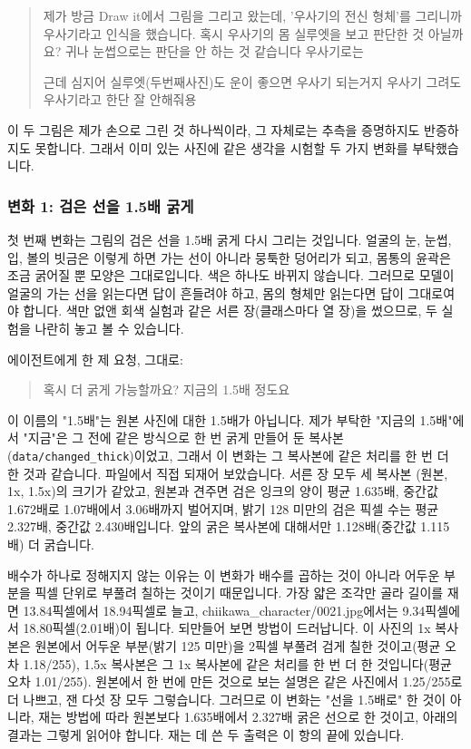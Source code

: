 \documentclass[11pt]{article}
\begin{document}
\begin{quote}\small
제가 방금 Draw it에서 그림을 그리고 왔는데, '우사기의 전신 형체'를
그리니까 우사기라고 인식을 했습니다. 혹시 우사기의 몸 실루엣을 보고
판단한 것 아닐까요? 귀나 눈썹으로는 판단을 안 하는 것 같습니다
우사기로는

근데 심지어 실루엣(두번째사진)도 운이 좋으면 우사기 되는거지 우사기
그려도 우사기라고 한단 잘 안해줘용
\end{quote}

이 두 그림은 제가 손으로 그린 것 하나씩이라, 그 자체로는 추측을 증명하지도
반증하지도 못합니다. 그래서 이미 있는 사진에 같은 생각을 시험할 두 가지 변화를
부탁했습니다.

\subsubsection*{변화 1: 검은 선을 1.5배 굵게}

첫 번째 변화는 그림의 검은 선을 1.5배 굵게 다시 그리는 것입니다. 얼굴의 눈,
눈썹, 입, 볼의 빗금은 이렇게 하면 가는 선이 아니라 뭉툭한 덩어리가 되고,
몸통의 윤곽은 조금 굵어질 뿐 모양은 그대로입니다. 색은 하나도 바뀌지 않습니다.
그러므로 모델이 얼굴의 가는 선을 읽는다면 답이 흔들려야 하고, 몸의 형체만
읽는다면 답이 그대로여야 합니다. 색만 없앤 회색 실험과 같은 서른 장(클래스마다
열 장)을 썼으므로, 두 실험을 나란히 놓고 볼 수 있습니다.

에이전트에게 한 제 요청, 그대로:
\begin{quote}\small
혹시 더 굵게 가능할까요? 지금의 1.5배 정도요
\end{quote}

이 이름의 "1.5배"는 원본 사진에 대한 1.5배가 아닙니다. 제가 부탁한 "지금의
1.5배"에서 "지금"은 그 전에 같은 방식으로 한 번 굵게 만들어 둔 복사본
(\texttt{data/changed\_thick})이었고, 그래서 이 변화는 그 복사본에 같은 처리를 한
번 더 한 것과 같습니다. 파일에서 직접 되재어 보았습니다. 서른 장 모두 세 복사본
(원본, 1x, 1.5x)의 크기가 같았고, 원본과 견주면 검은 잉크의 양이 평균 1.635배,
중간값 1.672배로 1.07배에서 3.06배까지 벌어지며, 밝기 128 미만의 검은 픽셀 수는
평균 2.327배, 중간값 2.430배입니다. 앞의 굵은 복사본에 대해서만 1.128배(중간값
1.115배) 더 굵습니다.

배수가 하나로 정해지지 않는 이유는 이 변화가 배수를 곱하는 것이 아니라 어두운
부분을 픽셀 단위로 부풀려 칠하는 것이기 때문입니다. 가장 얇은 조각만 골라 길이를
재면 13.84픽셀에서 18.94픽셀로 늘고, chiikawa\_character/0021.jpg에서는 9.34픽셀에서
18.80픽셀(2.01배)이 됩니다. 되만들어 보면 방법이 드러납니다. 이 사진의 1x 복사본은
원본에서 어두운 부분(밝기 125 미만)을 2픽셀 부풀려 검게 칠한 것이고(평균 오차
1.18/255), 1.5x 복사본은 그 1x 복사본에 같은 처리를 한 번 더 한 것입니다(평균 오차
1.01/255). 원본에서 한 번에 만든 것으로 보는 설명은 같은 사진에서 1.25/255로 더
나쁘고, 잰 다섯 장 모두 그렇습니다. 그러므로 이 변화는 "선을 1.5배로" 한 것이
아니라, 재는 방법에 따라 원본보다 1.635배에서 2.327배 굵은 선으로 한 것이고,
아래의 결과는 그렇게 읽어야 합니다. 재는 데 쓴 두 출력은 이 항의 끝에 있습니다.
\end{document}
